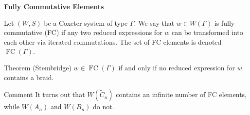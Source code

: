 \documentclass{beamer}
\DeclareMathOperator{\FC}{FC}
\newcommand{\C}{\widetilde{C}}
\begin{document}
\begin{frame}{\textbf{Fully Commutative Elements}}
\begin{definition}
Let $(W,S)$ be a Coxeter system of type $\Gamma$. We say that $w \in W(\Gamma)$ is \alert{fully commutative} (\alert{FC}) if any two reduced expressions for $w$ can be transformed into each other via iterated commutations. The set of FC elements is denoted $\FC(\Gamma)$.	
\end{definition}

\pause

\begin{block}{Theorem (Stembridge)}
$w \in \FC(\Gamma)$ if and only if no reduced expression for $w$ contains a braid.
\end{block}

\pause

\begin{block}{Comment}
	It turns out that $W(\C_n)$ contains an infinite number of FC elements, while $W(A_n)$ and $W(B_n)$ do not. 
\end{block}

\end{frame}

\end{document}
